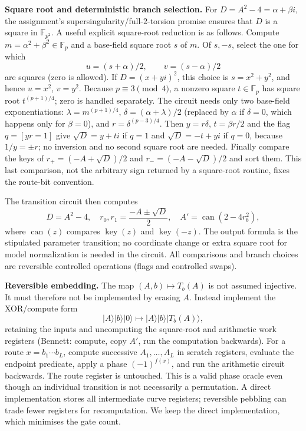\documentclass[10pt,a4paper]{article}
\begin{document}
\textbf{Square root and deterministic branch selection.} For $D=A^2-4=\alpha+\beta i$, the assignment's supersingularity/full-$2$-torsion promise ensures that $D$ is a square in $\mathbb F_{p^2}$. A useful explicit square-root reduction is as follows. Compute $m=\alpha^2+\beta^2\in\mathbb F_p$ and a base-field square root $s$ of $m$. Of $s,-s$, select the one for which
\[
u=(s+\alpha)/2,\qquad v=(s-\alpha)/2
\]
are squares (zero is allowed). If $D=(x+yi)^2$, this choice is $s=x^2+y^2$, and hence $u=x^2$, $v=y^2$. Because $p\equiv3\pmod4$, a nonzero square $t\in\mathbb F_p$ has square root $t^{(p+1)/4}$; zero is handled separately. The circuit needs only two base-field exponentiations: $\lambda=m^{(p+1)/4}$, $\delta=(\alpha+\lambda)/2$ (replaced by $\alpha$ if $\delta=0$, which happens only for $\beta=0$), and $r=\delta^{(p-3)/4}$. Then $y=r\delta$, $t=\beta r/2$ and the flag $q=[yr=1]$ give $\sqrt D=y+ti$ if $q=1$ and $\sqrt D=-t+yi$ if $q=0$, because $1/y=\pm r$; no inversion and no second square root are needed. Finally compare the keys of $r_+=(-A+\sqrt D)/2$ and $r_-=(-A-\sqrt D)/2$ and sort them. This last comparison, not the arbitrary sign returned by a square-root routine, fixes the route-bit convention.

The transition circuit then computes
\[
D=A^2-4,\quad r_0,r_1=\frac{-A\pm\sqrt D}{2},\quad
A'=\operatorname{can}(2-4r_b^2),
\]
where $\operatorname{can}(z)$ compares $\operatorname{key}(z)$ and $\operatorname{key}(-z)$. The output formula is the stipulated parameter transition; no coordinate change or extra square root for model normalization is needed in the circuit. All comparisons and branch choices are reversible controlled operations (flags and controlled swaps).

\textbf{Reversible embedding.} The map $(A,b)\mapsto T_b(A)$ is not assumed injective. It must therefore not be implemented by erasing $A$. Instead implement the XOR/compute form
\[
|A\rangle|b\rangle|0\rangle\longmapsto
|A\rangle|b\rangle|T_b(A)\rangle,
\]
retaining the inputs and uncomputing the square-root and arithmetic work registers (Bennett: compute, copy $A'$, run the computation backwards). For a route $x=b_1\cdots b_L$, compute successive $A_1,\ldots,A_L$ in scratch registers, evaluate the endpoint predicate, apply a phase $(-1)^{f(x)}$, and run the arithmetic circuit backwards. The route register is untouched. This is a valid phase oracle even though an individual transition is not necessarily a permutation. A direct implementation stores all intermediate curve registers; reversible pebbling can trade fewer registers for recomputation. We keep the direct implementation, which minimises the gate count.
\end{document}
